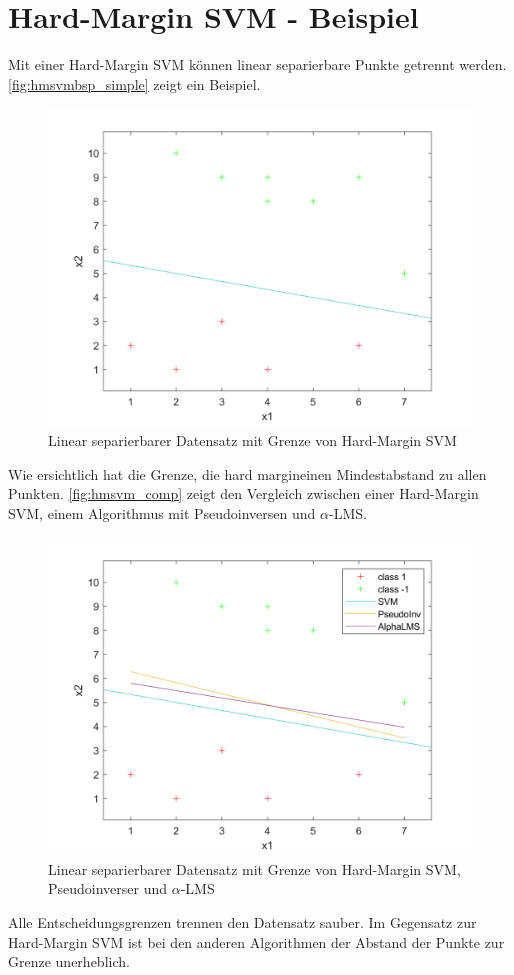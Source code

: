 \documentclass[a4paper,11pt,twoside]{scrreprt}
\begin{document}
\section{Hard-Margin SVM - Beispiel}\label{sec:hmsvmbsp}
Mit einer Hard-Margin \ac{SVM} können linear separierbare Punkte getrennt werden.
\autoref{fig:hmsvmbsp_simple} zeigt ein Beispiel.
\begin{figure}[H]
    \centering
    \includegraphics[width = 16cm]{../code/octave/images/svmsimple}
    \caption{Linear separierbarer Datensatz mit Grenze von Hard-Margin SVM}
    \label{fig:hmsvmbsp_simple}
\end{figure}
Wie ersichtlich hat die Grenze, die \glqq hard margin\grqq einen Mindestabstand zu allen Punkten.
\autoref{fig:hmsvm_comp} zeigt den Vergleich zwischen einer Hard-Margin SVM, einem Algorithmus mit Pseudoinversen und $\alpha$-LMS.
\begin{figure}[H]
    \centering
    \includegraphics[width = 16cm]{../code/octave/images/linearcompsmall}
    \caption{Linear separierbarer Datensatz mit Grenze von Hard-Margin SVM, Pseudoinverser und $\alpha$-LMS}
    \label{fig:hmsvm_comp}
\end{figure}
Alle Entscheidungsgrenzen trennen den Datensatz sauber.
Im Gegensatz zur Hard-Margin \ac{SVM} ist bei den anderen Algorithmen der Abstand der Punkte zur Grenze unerheblich.
\end{document}

